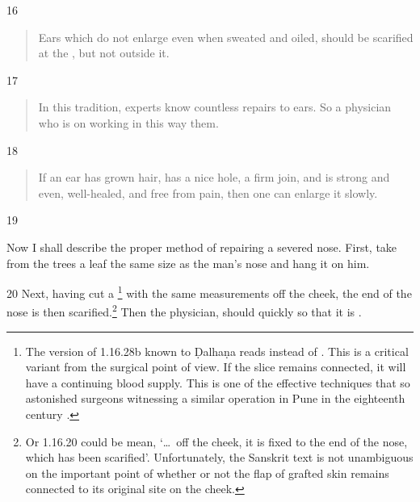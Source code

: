 \begin{translation}
    \item[16]
        \begin{verse}
    Ears which do not enlarge even when sweated and oiled, 
    should be scarified
    at the , but not outside it.  
        \end{verse}
    
    \item[17]
          \begin{verse}
    In this tradition, experts know countless repairs to ears.  So a 
    physician who is  on working in this way 
     them.
        \end{verse}
    
    \item[18]
           \begin{verse}
    If an ear has grown hair, has a nice hole, a firm join, and is strong and
    even, well-healed, and free from pain, then one can enlarge it slowly.
        \end{verse}
    
    \item[19]
    
    Now I shall describe the proper method of repairing a severed nose.
    First, take from the trees a leaf the same size as the man's nose and hang it
    on him. 
    
    \item[20] Next, having cut a \footnote{The
    version of 1.16.28b known to Ḍalhaṇa \citep[81]{vulgate} reads  instead of .
    This is a critical variant from the surgical point of view.  If the slice remains
    connected, it will have a continuing blood supply.  This is one of the effective 
    techniques that so astonished surgeons witnessing a similar operation in Pune in
    the eighteenth century \citep[see][67--70]{wuja-2003}.} with the same
    measurements off the cheek, the end of the nose is then scarified.\footnote{Or 1.16.20 could be mean, 
    `\ldots\ off the cheek, it is fixed to the end of the nose, which has been
    scarified'. Unfortunately, the Sanskrit text is not unambiguous on the
    important point of whether or not the flap of grafted skin remains connected
    to its original site on the cheek.} %
%
Then the  physician, 
    should quickly  so that it is 
    .
    

\end{translation}
